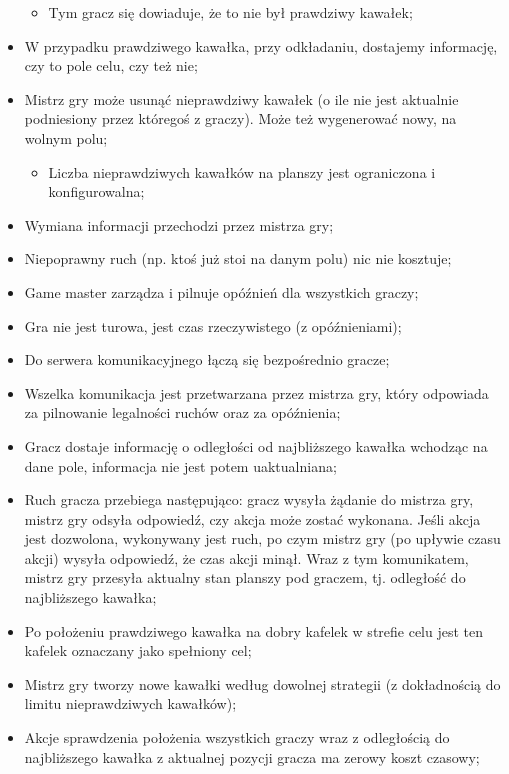 \documentclass[a4paper]{article}
\begin{document}
\begin{itemize}
  \begin{itemize}
  \item
    Tym gracz się dowiaduje, że to nie był prawdziwy kawałek;
  \end{itemize}
\item
  W przypadku prawdziwego kawałka, przy odkładaniu, dostajemy informację, czy to pole celu, czy też nie;
\item
  Mistrz gry może usunąć nieprawdziwy kawałek (o ile nie jest aktualnie podniesiony przez któregoś z graczy). Może też wygenerować nowy, na wolnym polu;

  \begin{itemize}
  \item
    Liczba nieprawdziwych kawałków na planszy jest ograniczona i konfigurowalna;
  \end{itemize}
\item
  Wymiana informacji przechodzi przez mistrza gry;
\item
  Niepoprawny ruch (np. ktoś już stoi na danym polu) nic nie kosztuje;
\item
  Game master zarządza i pilnuje opóźnień dla wszystkich graczy;
\item
  Gra nie jest turowa, jest czas rzeczywistego (z opóźnieniami);
\item
  Do serwera komunikacyjnego łączą się bezpośrednio gracze;
\item
  Wszelka komunikacja jest przetwarzana przez mistrza gry, który odpowiada za pilnowanie legalności ruchów oraz za opóźnienia;
\item
  Gracz dostaje informację o odległości od najbliższego kawałka wchodząc na dane pole, informacja nie jest potem uaktualniana;
\item
  Ruch gracza przebiega następująco: gracz wysyła żądanie do mistrza gry, mistrz gry odsyła odpowiedź, czy akcja może zostać wykonana. Jeśli akcja jest dozwolona, wykonywany jest ruch, po czym mistrz gry (po upływie czasu akcji) wysyła odpowiedź, że czas akcji minął. Wraz z tym komunikatem, mistrz gry przesyła aktualny stan planszy pod graczem, tj. odległość do najbliższego kawałka;
\item
  Po położeniu prawdziwego kawałka na dobry kafelek w strefie celu jest ten kafelek oznaczany jako spełniony cel;
\item
  Mistrz gry tworzy nowe kawałki według dowolnej strategii (z dokładnością do limitu nieprawdziwych kawałków);
\item
  Akcje sprawdzenia położenia wszystkich graczy wraz z odległością do najbliższego kawałka z aktualnej pozycji gracza ma zerowy koszt czasowy;

\end{itemize}
\end{document}
